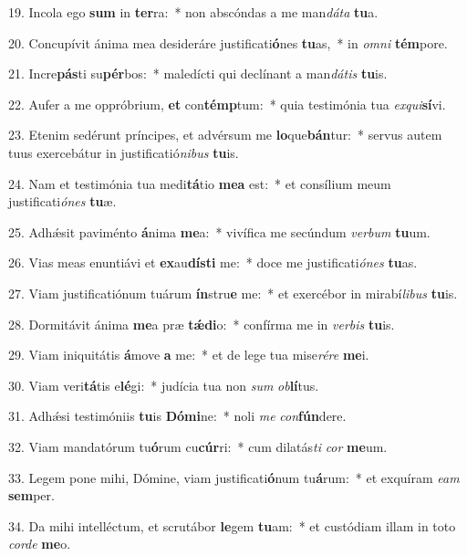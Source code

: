 19. Incola ego \textbf{sum} in \textbf{ter}ra:~*  non abscóndas a me man\textit{dá}\textit{ta} \textbf{tu}a.\

20. Concupívit ánima mea desideráre justificati\textbf{ó}nes \textbf{tu}as,~*  in \textit{om}\textit{ni} \textbf{tém}pore.\

21. Incre\textbf{pás}ti su\textbf{pér}bos:~*  maledícti qui declínant a man\textit{dá}\textit{tis} \textbf{tu}is.\

22. Aufer a me oppróbrium, \textbf{et} con\textbf{témp}tum:~*  quia testimónia tua \textit{ex}\textit{qui}\textbf{sí}vi.\

23. Etenim sedérunt príncipes, et advérsum me \textbf{lo}que\textbf{bán}tur:~*  servus autem tuus exercebátur in justificatió\textit{ni}\textit{bus} \textbf{tu}is.\

24. Nam et testimónia tua medi\textbf{tá}tio \textbf{me}\textbf{a} est:~*  et consílium meum justificati\textit{ó}\textit{nes} \textbf{tu}æ.\

25. Adhǽsit paviménto \textbf{á}nima \textbf{me}a:~*  vivífica me secúndum \textit{ver}\textit{bum} \textbf{tu}um.\

26. Vias meas enuntiávi et \textbf{ex}au\textbf{dís}\textbf{ti} me:~*  doce me justificati\textit{ó}\textit{nes} \textbf{tu}as.\

27. Viam justificatiónum tuárum \textbf{ín}stru\textbf{e} me:~*  et exercébor in mirabí\textit{li}\textit{bus} \textbf{tu}is.\

28. Dormitávit ánima \textbf{me}a præ \textbf{tǽ}\textbf{di}o:~*  confírma me in \textit{ver}\textit{bis} \textbf{tu}is.\

29. Viam iniquitátis \textbf{á}move \textbf{a} me:~*  et de lege tua mise\textit{ré}\textit{re} \textbf{me}i.\

30. Viam veri\textbf{tá}tis e\textbf{lé}gi:~*  judícia tua non \textit{sum} \textit{ob}\textbf{lí}tus.\

31. Adhǽsi testimóniis \textbf{tu}is \textbf{Dó}\textbf{mi}ne:~*  noli \textit{me} \textit{con}\textbf{fún}dere.\

32. Viam mandatórum tu\textbf{ó}rum cu\textbf{cúr}ri:~*  cum dilatás\textit{ti} \textit{cor} \textbf{me}um.\

33. Legem pone mihi, Dómine, viam justificati\textbf{ó}num tu\textbf{á}rum:~*  et exquíram \textit{e}\textit{am} \textbf{sem}per.\

34. Da mihi intelléctum, et scrutábor \textbf{le}gem \textbf{tu}am:~*  et custódiam illam in toto \textit{cor}\textit{de} \textbf{me}o.\

